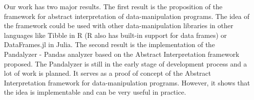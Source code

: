 \Large
Our work has two major results.
The first result is the proposition of the framework for abstract interpretation of data-manipulation programs.
The idea of the framework could be used with other data-manipulation libraries in other languages like
Tibble in R (R also has built-in support for data frames) or DataFrames.jl in Julia.
The second result is the implementation of the Pandalyzer - Pandas analyzer based
on the Abstract Interpretation framework proposed.
The Pandalyzer is still in the early stage of development process and a lot of work is planned.
It serves as a proof of concept of the Abstract Interpretation framework for data-manipulation programs.
However, it shows that the idea is implementable and can be very useful in practice.
